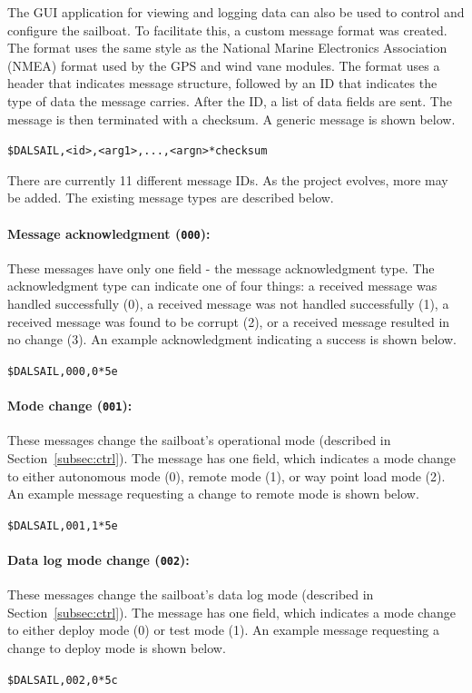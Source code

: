 \documentclass[12pt]{article}
\begin{document}
The GUI application for viewing and logging data can also be used to control and configure the sailboat. To facilitate this, a custom message format was created. The format uses the same style as the National Marine Electronics Association (NMEA) format used by the GPS and wind vane modules. The format uses a header that indicates message structure, followed by an ID that indicates the type of data the message carries. After the ID, a list of data fields are sent. The message is then terminated with a checksum. A generic message is shown below.

\begin{center}
	\texttt{\$DALSAIL,<id>,<arg1>,...,<argn>*checksum}
\end{center}

There are currently 11 different message IDs. As the project evolves, more may be added. The existing message types are described below.

\paragraph{Message acknowledgment (\texttt{000}):}
These messages have only one field - the message acknowledgment type. The acknowledgment type can indicate one of four things: a received message was handled successfully (0), a received message was not handled successfully (1), a received message was found to be corrupt (2), or a received message resulted in no change (3). An example acknowledgment indicating a success is shown below.
\begin{center}
	\texttt{\$DALSAIL,000,0*5e}
\end{center}

\paragraph{Mode change (\texttt{001}):}
These messages change the sailboat's operational mode (described in Section~\ref{subsec:ctrl}). The message has one field, which indicates a mode change to either autonomous mode (0), remote mode (1), or way point load mode (2). An example message requesting a change to remote mode is shown below.
\begin{center}
	\texttt{\$DALSAIL,001,1*5e}
\end{center}

\paragraph{Data log mode change (\texttt{002}):}
These messages change the sailboat's data log mode (described in Section~\ref{subsec:ctrl}). The message has one field, which indicates a mode change to either deploy mode (0) or test mode (1). An example message requesting a change to deploy mode is shown below.
\begin{center}
	\texttt{\$DALSAIL,002,0*5c}
\end{center}
\end{document}
